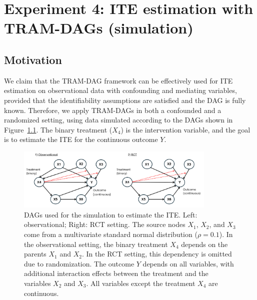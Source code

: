 

















\chapter{Experiment 4: ITE estimation with TRAM-DAGs (simulation)}








\section{Motivation}

We claim that the TRAM-DAG framework can be effectively used for ITE estimation on observational data with confounding and mediating variables, provided that the identifiability assumptions are satisfied and the DAG is fully known. Therefore, we apply TRAM-DAGs in both a confounded and a randomized setting, using data simulated according to the DAGs shown in Figure~\ref{fig:ite_dag_observational}. The binary treatment ($X_4$) is the intervention variable, and the goal is to estimate the ITE for the continuous outcome $Y$.


\begin{figure}[H]
\centering
\includegraphics[width=0.85\textwidth]{img/exp4_dags.png}
\caption{DAGs used for the simulation to estimate the ITE. Left: observational; Right: RCT setting. The source nodes $X_1$, $X_2$, and $X_3$ come from a multivariate standard normal distribution ($\rho=0.1$). In the observational setting, the binary treatment $X_4$ depends on the parents $X_1$ and $X_2$. In the RCT setting, this dependency is omitted due to randomization. The outcome $Y$ depends on all variables, with additional interaction effects between the treatment and the variables $X_2$ and $X_3$. All variables except the treatment $X_4$ are continuous.}
\label{fig:ite_dag_observational}
\end{figure}

